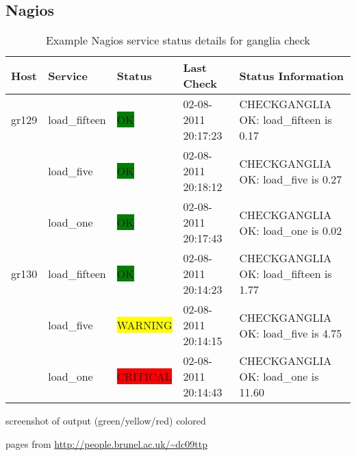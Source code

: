 \subsection{Nagios}
\begin{table}[ht]
\small\addtolength{\tabcolsep}{-3pt}
\begin{tabular}{ | l | l | l | l | l |}
\hline
 Host & Service & Status & Last Check & Status Information \\ \hline
 gr129 & load\_fifteen & \colorbox{green}{OK} & 02-08-2011 20:17:23 & CHECKGANGLIA OK: load\_fifteen is 0.17 \\
\hline
  & load\_five & \colorbox{green}{OK} & 02-08-2011 20:18:12 & CHECKGANGLIA OK: load\_five is 0.27 \\
\hline
  & load\_one & \colorbox{green}{OK} & 02-08-2011 20:17:43 & CHECKGANGLIA OK: load\_one is 0.02 \\
\hline
 gr130 & load\_fifteen & \colorbox{green}{OK} & 02-08-2011 20:14:23 & CHECKGANGLIA OK: load\_fifteen is 1.77 \\
\hline
  & load\_five & \colorbox{yellow}{WARNING} & 02-08-2011 20:14:15 & CHECKGANGLIA OK: load\_five is 4.75 \\
\hline
 & load\_one & \colorbox{red}{CRITICAL} & 02-08-2011 20:14:43 & CHECKGANGLIA OK: load\_one is 11.60 \\
\hline
\end{tabular}
\caption{Example Nagios service status details for ganglia check}
\label{tab:nagios_service_detail}
\end{table}

screenshot of output (green/yellow/red) colored


pages from \url{http://people.brunel.ac.uk/~dc09ttp}

